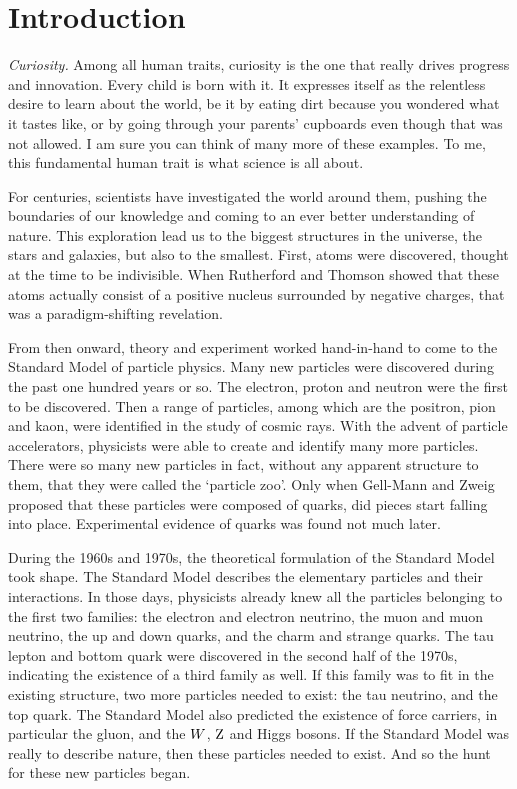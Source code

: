 \chapter{Introduction \label{chap:introduction}}

\textit{Curiosity.} Among all human traits, curiosity is the one that really drives progress and
innovation. Every child is born with it. It expresses itself as the relentless desire to learn about
the world, be it by eating dirt because you wondered what it tastes like, or by going through your
parents' cupboards even though that was not allowed. I am sure you can think of many more of these
examples. 
To me, this fundamental human trait is what science is all about. 

For centuries, scientists have investigated the world around them, pushing the boundaries of
our knowledge and coming to an ever better understanding of nature.
This exploration lead us to the biggest structures in the universe, the stars and galaxies, but
also to the smallest. First, atoms were discovered, thought at the time to be indivisible.
When Rutherford and Thomson showed that these atoms actually consist of a positive nucleus
surrounded by negative charges, that was a paradigm-shifting revelation. 

From then onward, theory and experiment worked hand-in-hand to come to the Standard Model of
particle physics. Many new particles were discovered during the past one hundred years or so. 
The electron, proton and neutron were the first to be discovered. Then a range of particles,
among which are the positron, pion and kaon, were identified in the study of cosmic rays. 
With the advent of particle accelerators, physicists were able to create and identify many more
particles. There were so many new particles in fact, without any apparent structure to them, that
they were called the `particle zoo'. Only when Gell-Mann and Zweig proposed that these particles
were composed of quarks, did pieces start falling into place. Experimental evidence of quarks was
found not much later. 

During the 1960s and 1970s, the theoretical formulation of the Standard Model took shape. 
The Standard Model describes the elementary particles and their interactions. In those days,
physicists already knew all the particles belonging to the first two families: the electron and
electron neutrino, the muon and muon neutrino, the up and down quarks, and the charm and strange
quarks. The tau lepton and bottom quark were discovered in the second half of the 1970s, indicating
the existence of a third family as well. If this family was to fit in the existing structure, two
more particles needed to exist: the tau neutrino, and the top quark. 
The Standard Model also predicted the existence of force carriers, in particular the gluon, and
the $W$, $\mathrm{Z}$ and Higgs bosons. 
If the Standard Model was really to describe nature, then these particles needed to exist. And so
the hunt for these new particles began.

